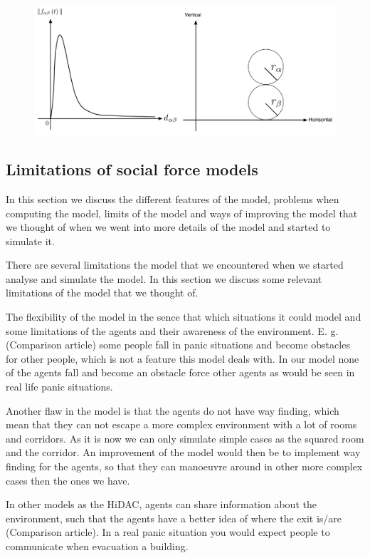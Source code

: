 \begin{figure}[hb]   
 \centering
 \includegraphics[scale=0.35]{Figures/ForceOverlapping.pdf}
    \caption{}
  	\label{forceoverlapping}
\end{figure}
 
\subsection{Limitations of social force models}
In this section we discuss the different features of the model, problems when 
computing the model, limits of the model and ways of improving the model that 
we thought of when we went into more details of the model and started to 
simulate it.

There are several limitations the model that we encountered when we started 
analyse and simulate the model. In this section we discuss some relevant 
limitations of the model that we thought of.

The flexibility of the model in the sence that which situations it could model 
and some limitations of the agents and their awareness of the environment.
E. g. (Comparison article) some people fall in panic situations and become 
obstacles for other people, which is not a feature this model deals with. In 
our model none of the agents fall and become an obstacle force other agents as 
would be seen in real life panic situations.

Another flaw in the model is that the agents do not have way finding, which 
mean that they can not escape a more complex environment with a lot of rooms 
and corridors. As it is now we can only simulate simple cases as the squared 
room and the corridor.  An improvement of the model would then be to implement 
way finding for the agents, so that they can manoeuvre around in other more 
complex cases then the ones we have.

In other models as the HiDAC, agents can share information about the 
environment, such that the agents have a better idea of where the exit is/are 
(Comparison article). In a real panic situation you would expect people to 
communicate when evacuation a building.

